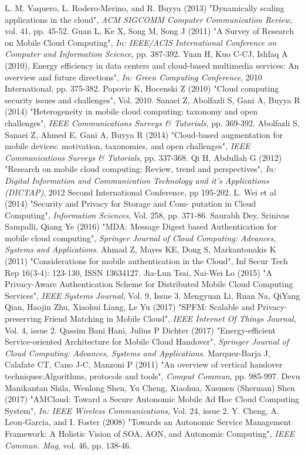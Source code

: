 \documentclass[10pt,a4paper,journal]{IEEEtran}
\begin{document}
 
\begin{thebibliography}{16}
 L. M. Vaquero, L. Rodero-Merino, and R. Buyya (2013) "Dynamically scaling applications in the cloud", \textit{ACM SIGCOMM Computer Communication Review}, vol. 41, pp. 45-52.
Guan L, Ke X, Song M, Song J (2011) "A Survey of Research on Mobile
Cloud Computing", \textit{In: IEEE/ACIS International Conference on Computer and Information Science}, pp. 387-392.
Yuan H, Kuo C-CJ, Ishfaq A (2010), Energy efficiency in data centers and
cloud-based multimedia services: An overview and future directions", \textit{In: Green Computing Conference}, 2010 International, pp. 375-382.
Popovic K, Hocenski Z (2010) "Cloud computing security issues and
challenges", Vol. 2010.
Sanaei Z, Abolfazli S, Gani A, Buyya R (2014) "Heterogeneity in mobile cloud
computing: taxonomy and open challenges", \textit{IEEE Communications Surveys & Tutorials}, pp. 369-392.
Abolfazli S, Sanaei Z, Ahmed E, Gani A, Buyya R (2014) "Cloud-based
augmentation for mobile devices: motivation, taxonomies, and open challenges", \textit{IEEE Communications Surveys & Tutorials}, pp. 337-368.
Qi H, Abdullah G (2012) "Research on mobile cloud computing: Review, trend and perspectives", \textit{In: Digital Information and Communication Technology and it's Applications (DICTAP)}, 2012 Second International Conference, pp 195-202.
 L. Wei et al (2014) "Security and Privacy for Storage and Com-
putation in Cloud Computing", \textit{Information Sciences}, Vol. 258, pp. 371-86.
Saurabh Dey, Srinivas Sampalli, Qiang Ye (2016) "MDA: Message Digest based Authentication for mobile cloud computing", \textit{Springer Journal of Cloud Computing: Advances, Systems and Applications}.
 Ahmad Z, Mayes KE, Dong S, Markantonakis K (2011) "Considerations for
mobile authentication in the Cloud", Inf Secur Tech Rep 16(3-4): 123-130, ISSN 13634127.
Jia-Lun Tsai, Nai-Wei Lo (2015) "A Privacy-Aware Authentication Scheme for Distributed Mobile Cloud Computing Services", \textit{IEEE Systems Journal}, Vol. 9, Issue 3.
Mengyuan Li, Ruan Na, QiYang Qian, Haojin Zhu, Xiaohui Liang, Le Yu (2017) "SPFM: Scalable and Privacy-preserving Friend Matching in Mobile Cloud", \textit{IEEE Internet Of Things Journal}, Vol. 4, issue 2.
Qassim Bani Hani, Julius P Dichter (2017) "Energy-efficient Service-oriented Architecture for Mobile Cloud Handover", \textit{Springer Journal of Cloud Computing: Advances, Systems and Applications}.
Marquez-Barja J, Calafate CT, Cano J-C, Manzoni P (2011) "An overview of
vertical handover techniques:Algorithms, protocols and tools", \textit{Comput Commun}, pp. 985-997.
 Devu Manikantan Shila, Wenlong Shen, Yu Cheng, Xiaohua, Xuemen
(Sherman) Shen (2017) "AMCloud: Toward a Secure Autonomic Mobile Ad Hoc Cloud Computing System", \textit{In: IEEE Wireless Communications}, Vol. 24, issue 2.
Y. Cheng, A. Leon-Garcia, and I. Foster (2008) "Towards an
Autonomic Service Management Framework: A Holistic
Vision of SOA, AON, and Autonomic Computing", \textit{IEEE Commun. Mag}, vol. 46, pp. 138-46.
\end{thebibliography}
\end{document}
